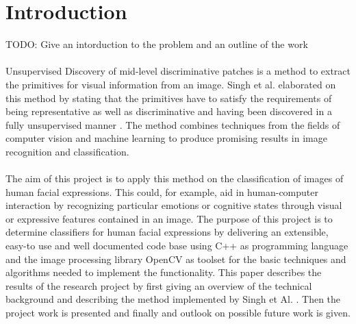 
\section{Introduction}\label{sec:Introduction}

TODO: Give an intorduction to the problem and an outline of the work
\\
\\
Unsupervised Discovery of mid-level discriminative patches is a method to extract the primitives for visual information from an image.  Singh et al. elaborated on this method by stating that the primitives have to satisfy the requirements of being representative as well as discriminative and having been discovered in a fully unsupervised manner \cite{Singh2012DiscPat}. The method combines techniques from the fields of computer vision and machine learning to produce promising results in image recognition and classification. 
\\
\\
The aim of this project is to apply this method on the classification of images of human facial expressions. This could, for example, aid in human-computer interaction by recognizing particular emotions or cognitive states through visual or expressive features contained in an image. The purpose of this project is to determine classifiers for human facial expressions by delivering an extensible, easy-to use and well documented code base using C++ as programming language and the image processing library OpenCV as toolset for the basic techniques and algorithms needed to implement the functionality. This paper describes the results of the research project by first giving an overview of the technical background and describing the method implemented by Singh et Al. \cite{Singh2012DiscPat}. Then the project work is presented and finally and outlook on possible future work is given.